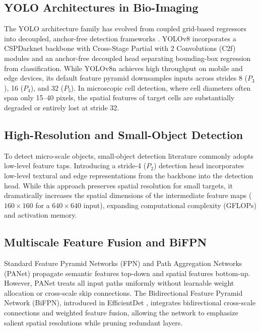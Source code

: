 \documentclass[conference]{IEEEtran}
\begin{document}
\subsection{YOLO Architectures in Bio-Imaging}
The YOLO architecture family has evolved from coupled grid-based regressors into decoupled, anchor-free detection frameworks \cite{jocher2023yolo, wang2023yolov7, li2022yolov6}. YOLOv8 incorporates a CSPDarknet backbone with Cross-Stage Partial with 2 Convolutions (C2f) modules and an anchor-free decoupled head separating bounding-box regression from classification. While YOLOv8n achieves high throughput on mobile and edge devices, its default feature pyramid downsamples inputs across strides 8 ($P_3$), 16 ($P_4$), and 32 ($P_5$). In microscopic cell detection, where cell diameters often span only 15--40 pixels, the spatial features of target cells are substantially degraded or entirely lost at stride 32.

\subsection{High-Resolution and Small-Object Detection}
To detect micro-scale objects, small-object detection literature commonly adopts low-level feature taps. Introducing a stride-4 ($P_2$) detection head incorporates low-level textural and edge representations from the backbone into the detection head. While this approach preserves spatial resolution for small targets, it dramatically increases the spatial dimensions of the intermediate feature maps ($160 \times 160$ for a $640 \times 640$ input), expanding computational complexity (GFLOPs) and activation memory.

\subsection{Multiscale Feature Fusion and BiFPN}
Standard Feature Pyramid Networks (FPN) and Path Aggregation Networks (PANet) propagate semantic features top-down and spatial features bottom-up. However, PANet treats all input paths uniformly without learnable weight allocation or cross-scale skip connections. The Bidirectional Feature Pyramid Network (BiFPN), introduced in EfficientDet \cite{tan2020efficientdet}, integrates bidirectional cross-scale connections and weighted feature fusion, allowing the network to emphasize salient spatial resolutions while pruning redundant layers.
\end{document}
